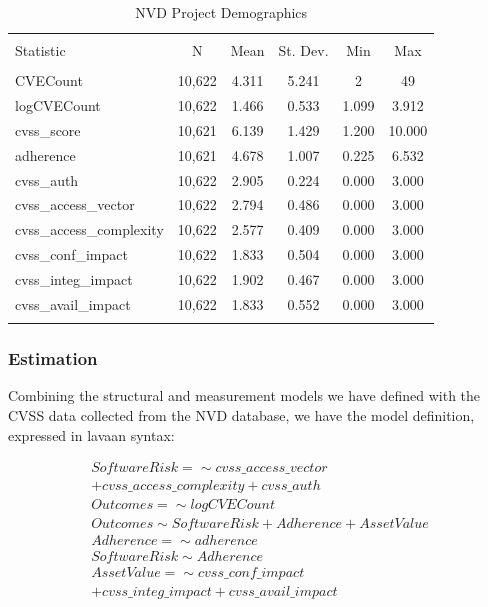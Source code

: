\begin{table}[!htbp] \centering 
	\caption{NVD Project Demographics} 
	\label{tab:nvd_demog} 
	\begin{small}
	\begin{tabular}{@{\extracolsep{5pt}}lccccc} 
		\\[-1.8ex]\hline 
		\hline \\[-1.8ex] 
		Statistic & \multicolumn{1}{c}{N} & \multicolumn{1}{c}{Mean} & \multicolumn{1}{c}{St. Dev.} & \multicolumn{1}{c}{Min} & \multicolumn{1}{c}{Max} \\ 
		\hline \\[-1.8ex] 
		CVECount & 10,622 & 4.311 & 5.241 & 2 & 49 \\ 
		logCVECount & 10,622 & 1.466 & 0.533 & 1.099 & 3.912 \\ 
		cvss\_score & 10,621 & 6.139 & 1.429 & 1.200 & 10.000 \\ 
		adherence & 10,621 & 4.678 & 1.007 & 0.225 & 6.532 \\ 
		cvss\_auth & 10,622 & 2.905 & 0.224 & 0.000 & 3.000 \\ 
		cvss\_access\_vector & 10,622 & 2.794 & 0.486 & 0.000 & 3.000 \\ 
		cvss\_access\_complexity & 10,622 & 2.577 & 0.409 & 0.000 & 3.000 \\ 
		cvss\_conf\_impact & 10,622 & 1.833 & 0.504 & 0.000 & 3.000 \\ 
		cvss\_integ\_impact & 10,622 & 1.902 & 0.467 & 0.000 & 3.000 \\ 
		cvss\_avail\_impact & 10,622 & 1.833 & 0.552 & 0.000 & 3.000 \\ 
		\hline \\[-1.8ex] 
	\end{tabular} 
		\end{small}
	
\end{table} 

\subsubsection{Estimation}

Combining the structural and measurement models we have defined with the CVSS data collected from the NVD database, we have the model definition, expressed in lavaan syntax: 

\begin{align*}
	SoftwareRisk =\sim cvss\_access\_vector \\ + cvss\_access\_complexity + cvss\_auth\\
	Outcomes =\sim logCVECount\\
	Outcomes \sim SoftwareRisk + Adherence + AssetValue\\
	Adherence =\sim adherence\\
	SoftwareRisk \sim Adherence\\
	AssetValue =\sim cvss\_conf\_impact\\
	 + cvss\_integ\_impact + cvss\_avail\_impact\\
\end{align*}		

